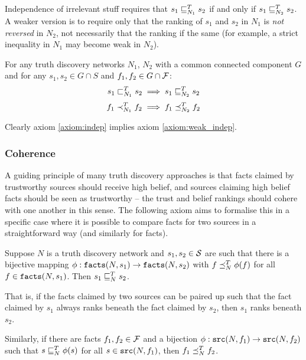 \documentclass[../main.tex]{subfiles}
\begin{document}
Independence of irrelevant stuff requires that $s_1 \sle_{N_1}^T s_2$ if and
only if $s_1 \sle_{N_2}^T s_2$. A weaker version is to require only that the
ranking of $s_1$ and $s_2$ in $N_1$ is \emph{not reversed} in $N_2$, not
necessarily that the ranking if the same (for example, a strict inequality in
$N_1$ may become weak in $N_2$).

\begin{axiom}
\label{axiom:weak_indep}
For any truth discovery networks $N_1$, $N_2$ with a common connected component
$G$ and for any $s_1, s_2 \in G \cap S$ and $f_1, f_2 \in G \cap \F$:
\[
    s_1 \slt_{N_1}^T s_2 \implies s_1 \sle_{N_2}^T s_2
\]
\[
    f_1 \flt_{N_1}^T f_2 \implies f_1 \fle_{N_2}^T f_2
\]
\end{axiom}

Clearly axiom \ref{axiom:indep} implies axiom \ref{axiom:weak_indep}.

\subsubsection{Coherence}

A guiding principle of many truth discovery approaches is that facts claimed by
trustworthy sources should receive high belief, and sources claiming high
belief facts should be seen as trustworthy -- the trust and belief rankings
should cohere with one another in this sense. The following axiom aims to
formalise this in a specific case where it is possible to compare facts for two
sources in a straightforward way (and similarly for facts).

\begin{axiom}[Coherence]
Suppose $N$ is a truth discovery network and $s_1, s_2 \in \S$ are such that
there is a bijective mapping $\phi: \fact(N, s_1) \rightarrow \fact(N, s_2)$
with $f \fle_N^T \phi(f)$ for all $f \in \fact(N, s_1)$. Then $s_1 \sle_N^T
s_2$.

That is, if the facts claimed by two sources can be paired up such that the
fact claimed by $s_1$ always ranks beneath the fact claimed by $s_2$, then
$s_1$ ranks beneath $s_2$.

Similarly, if there are facts $f_1, f_2 \in \F$ and a bijection $\phi: \src(N,
f_1) \rightarrow \src(N, f_2)$ such that $s \sle_N^T \phi(s)$ for all $s \in
\src(N, f_1)$, then $f_1 \fle_N^T f_2$.

\end{axiom}

\end{document}
